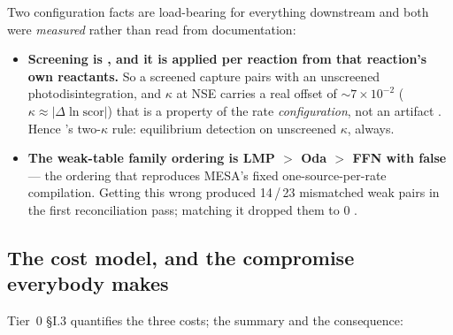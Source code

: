 Two configuration facts are load-bearing for everything downstream and both
were \emph{measured} rather than read from documentation:

\begin{itemize}
\item \textbf{Screening is , and it is applied per
  reaction from that reaction's own reactants.} So a screened capture pairs with
  an unscreened photodisintegration, and $\kappa$ at NSE carries a real offset of
  ${\sim}7 \times 10^{-2}$ ($\kappa \approx |\Delta \ln \mathrm{scor}|$) that is
  a property of the rate \emph{configuration}, not an artifact
  . Hence 's two-$\kappa$ rule:
  equilibrium detection on unscreened $\kappa$, always.
\item \textbf{The weak-table family ordering is LMP $>$ Oda $>$ FFN with
   false} --- the ordering that reproduces MESA's fixed
  one-source-per-rate compilation. Getting this wrong produced 14\,/\,23
  mismatched weak pairs in the first reconciliation pass; matching it dropped
  them to 0 .
\end{itemize}

\subsection{The cost model, and the compromise everybody makes}
\label{sec:costmodel}

Tier~0 \S I.3 quantifies the three costs; the summary and the consequence:

